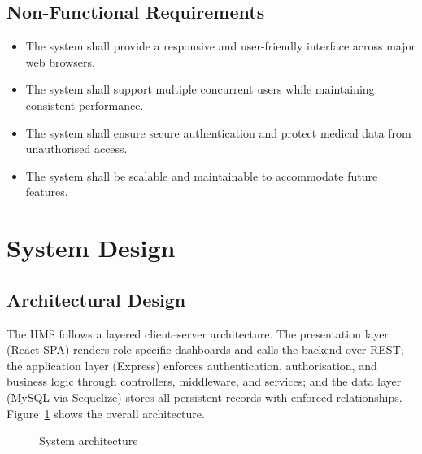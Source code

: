 \documentclass[12pt,a4paper]{report}
\begin{document}
\subsection{Non-Functional Requirements}
\begin{itemize}[leftmargin=1.4em]
  \item The system shall provide a responsive and user-friendly interface across major
        web browsers.
  \item The system shall support multiple concurrent users while maintaining consistent
        performance.
  \item The system shall ensure secure authentication and protect medical data from
        unauthorised access.
  \item The system shall be scalable and maintainable to accommodate future features.
\end{itemize}

\section{System Design}

\subsection{Architectural Design}
The HMS follows a layered client--server architecture. The presentation layer (React
SPA) renders role-specific dashboards and calls the backend over REST; the application
layer (Express) enforces authentication, authorisation, and business logic through
controllers, middleware, and services; and the data layer (MySQL via Sequelize) stores
all persistent records with enforced relationships. Figure~\ref{fig:arch} shows the
overall architecture.

\begin{figure}[htbp]
\centering
{}
\caption{System architecture}
\label{fig:arch}
\end{figure}
\end{document}
